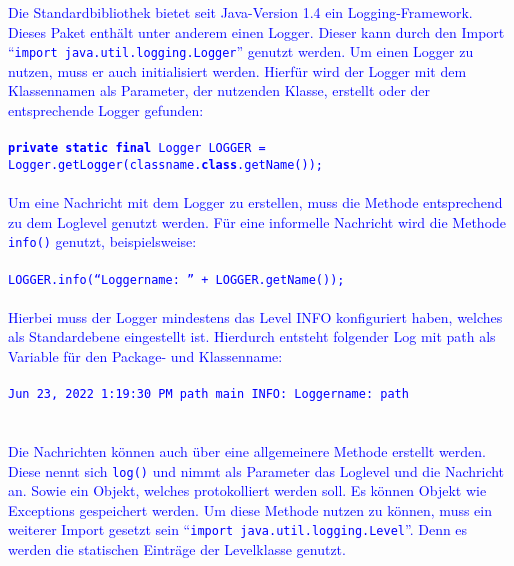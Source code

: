 \textcolor{blue}{
    Die Standardbibliothek bietet seit Java-Version 1.4 ein Logging-Framework.
    Dieses Paket enthält unter anderem einen Logger.
    Dieser kann durch den Import \enquote{\texttt{import java.util.logging.Logger}} genutzt werden.
    Um einen Logger zu nutzen, muss er auch initialisiert werden.
    Hierfür wird der Logger mit dem Klassennamen als Parameter, der nutzenden Klasse, erstellt oder der entsprechende Logger gefunden:
    \\
    \\
    \hspace*{10mm}
    \texttt{\textbf{private static final} Logger LOGGER =
        \\
        \hspace*{30mm}Logger.getLogger(classname.\textbf{class}.getName());}
    \\
    \\
    Um eine Nachricht mit dem Logger zu erstellen, muss die Methode entsprechend zu dem Loglevel genutzt werden.
    Für eine informelle Nachricht wird die Methode \texttt{info()} genutzt, beispielsweise:
    \\
    \\
    \hspace*{10mm}
    \texttt{LOGGER.info(\enquote{Loggername: } + LOGGER.getName());}
    \\
    \\
    Hierbei muss der Logger mindestens das Level INFO konfiguriert haben, welches als Standardebene eingestellt ist.
    Hierdurch entsteht folgender Log mit path als Variable für den Package- und Klassenname:
    \\
    \\
    \hspace*{10mm}
    \texttt{Jun 23, 2022 1:19:30 PM path main INFO: Loggername: path}
    \\
    \\
    \\
    Die Nachrichten können auch über eine allgemeinere Methode erstellt werden.
    Diese nennt sich \texttt{log()} und nimmt als Parameter das Loglevel und die Nachricht an.
    Sowie ein Objekt, welches protokolliert werden soll.
    Es können Objekt wie Exceptions gespeichert werden.
    Um diese Methode nutzen zu können, muss ein weiterer Import gesetzt sein \enquote{\texttt{import java.util.logging.Level}}.
    Denn es werden die statischen Einträge der Levelklasse genutzt.
    \\
    \\
    \hspace*{10mm}
}
